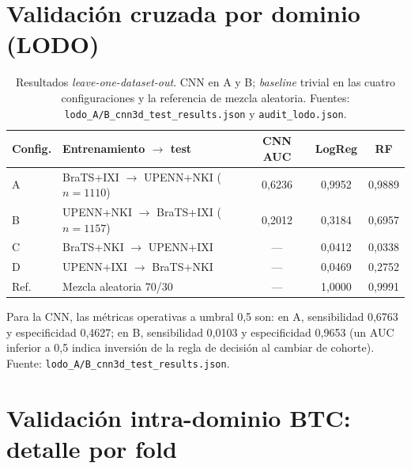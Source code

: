 \section{Validación cruzada por dominio (LODO)}

\begin{table}[ht]
  \centering
  \caption[Detalle LODO: CNN y baseline]{Resultados \emph{leave-one-dataset-out}.
  CNN en A y B; \emph{baseline} trivial en las cuatro configuraciones y la
  referencia de mezcla aleatoria. Fuentes: \texttt{lodo\_A/B\_cnn3d\_test\_results.json}
  y \texttt{audit\_lodo.json}.}
  \label{tab:apx_lodo}
  \begin{tabular}{l l c c c}
    \hline
    \textbf{Config.} & \textbf{Entrenamiento $\rightarrow$ test} & \textbf{CNN AUC} & \textbf{LogReg} & \textbf{RF} \\
    \hline
    A & BraTS+IXI $\rightarrow$ UPENN+NKI ($n=1110$) & 0,6236 & 0,9952 & 0,9889 \\
    B & UPENN+NKI $\rightarrow$ BraTS+IXI ($n=1157$) & 0,2012 & 0,3184 & 0,6957 \\
    C & BraTS+NKI $\rightarrow$ UPENN+IXI            & ---    & 0,0412 & 0,0338 \\
    D & UPENN+IXI $\rightarrow$ BraTS+NKI            & ---    & 0,0469 & 0,2752 \\
    Ref. & Mezcla aleatoria 70/30                    & ---    & 1,0000 & 0,9991 \\
    \hline
  \end{tabular}
\end{table}

Para la CNN, las métricas operativas a umbral 0,5 son: en A, sensibilidad 0,6763
y especificidad 0,4627; en B, sensibilidad 0,0103 y especificidad 0,9653 (un AUC
inferior a 0,5 indica inversión de la regla de decisión al cambiar de cohorte).
Fuente: \texttt{lodo\_A/B\_cnn3d\_test\_results.json}.

\section{Validación intra-dominio BTC: detalle por fold}

